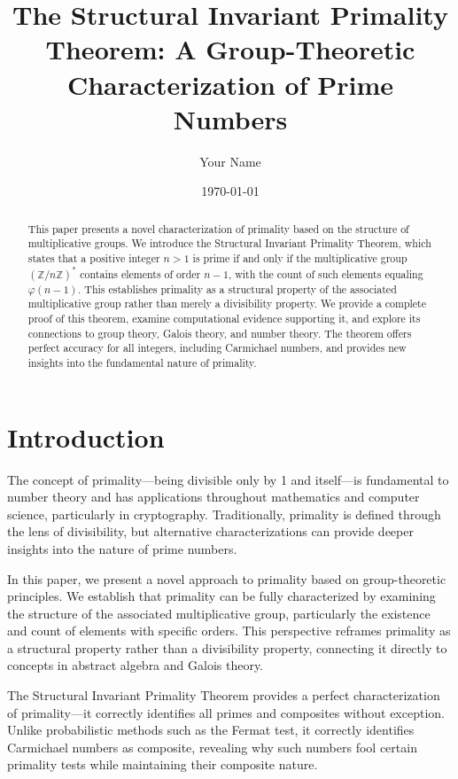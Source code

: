 \documentclass[11pt,a4paper]{article}
\title{The Structural Invariant Primality Theorem: A Group-Theoretic Characterization of Prime Numbers}
\author{Your Name}
\date{\today}
\newcommand{\Z}{\mathbb{Z}}
\newcommand{\ZnZstar}[1]{(\Z/{#1}\Z)^{*}}
\newcommand{\totient}{\varphi}
\begin{document}
\maketitle

\begin{abstract}
This paper presents a novel characterization of primality based on the structure of multiplicative groups. We introduce the Structural Invariant Primality Theorem, which states that a positive integer $n > 1$ is prime if and only if the multiplicative group $\ZnZstar{n}$ contains elements of order $n-1$, with the count of such elements equaling $\totient(n-1)$. This establishes primality as a structural property of the associated multiplicative group rather than merely a divisibility property. We provide a complete proof of this theorem, examine computational evidence supporting it, and explore its connections to group theory, Galois theory, and number theory. The theorem offers perfect accuracy for all integers, including Carmichael numbers, and provides new insights into the fundamental nature of primality.
\end{abstract}

\section{Introduction}

The concept of primality—being divisible only by 1 and itself—is fundamental to number theory and has applications throughout mathematics and computer science, particularly in cryptography. Traditionally, primality is defined through the lens of divisibility, but alternative characterizations can provide deeper insights into the nature of prime numbers.

In this paper, we present a novel approach to primality based on group-theoretic principles. We establish that primality can be fully characterized by examining the structure of the associated multiplicative group, particularly the existence and count of elements with specific orders. This perspective reframes primality as a structural property rather than a divisibility property, connecting it directly to concepts in abstract algebra and Galois theory.

The Structural Invariant Primality Theorem provides a perfect characterization of primality—it correctly identifies all primes and composites without exception. Unlike probabilistic methods such as the Fermat test, it correctly identifies Carmichael numbers as composite, revealing why such numbers fool certain primality tests while maintaining their composite nature.
\end{document}
